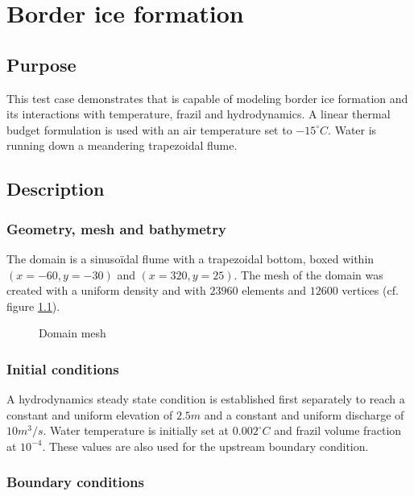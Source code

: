 \renewcommand{\labelitemi}{$\triangleright$}

\chapter{Border ice formation}

\section{Purpose}
This test case demonstrates that \khione is capable of modeling border ice formation and its interactions with
temperature, frazil and hydrodynamics.
A linear thermal budget formulation is used with an air temperature set to $-15^{\circ} C$. Water is running down a meandering trapezoidal flume.

\section{Description}

\subsection{Geometry, mesh and bathymetry}
The domain is a sinusoïdal flume with a trapezoidal bottom, boxed within $(x=-60, y=-30)$ and $(x=320, y=25)$.
The mesh of the domain was created with a uniform density and with $23960$ elements and $12600$ vertices (cf. figure \ref{fig:mesh}).

\begin{figure}[H]
    \begin{center}
    \end{center}
    \caption{Domain mesh}
    \label{fig:mesh}
\end{figure}

\subsection{Initial conditions}

A hydrodynamics steady state condition is established first separately to reach a constant and uniform elevation of $2.5m$ and a constant and uniform discharge of $10m^3/s$.
Water temperature is initially set at $0.002^\circ C$ and frazil volume fraction at $10^{-4}$. These values are also used for the upstream boundary condition.

\subsection{Boundary conditions}

